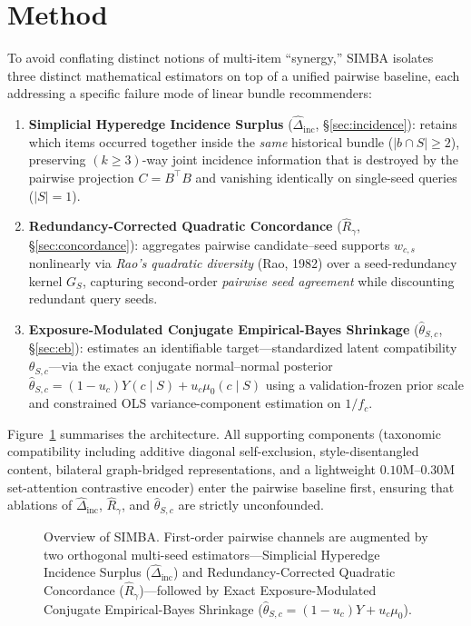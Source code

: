 \section{Method}
\label{sec:method}

To avoid conflating distinct notions of multi-item ``synergy,'' \textsc{SIMBA} isolates three distinct
mathematical estimators on top of a unified pairwise baseline, each addressing a specific failure mode of linear
bundle recommenders:
\begin{enumerate}\itemsep1pt
  \item \textbf{Simplicial Hyperedge Incidence Surplus} ($\hat{\Delta}_{\text{inc}}$, \S\ref{sec:incidence}):
  retains which items occurred together inside the \emph{same} historical bundle ($\lvert b \cap S\rvert \ge 2$),
  preserving $(k \ge 3)$-way joint incidence information that is destroyed by the pairwise projection $C = B^{\!\top} B$
  and vanishing identically on single-seed queries ($\lvert S\rvert = 1$).
  \item \textbf{Redundancy-Corrected Quadratic Concordance} ($\hat{R}_{\gamma}$, \S\ref{sec:concordance}):
  aggregates pairwise candidate--seed supports $w_{c,s}$ nonlinearly via \emph{Rao's quadratic diversity}
  (Rao, 1982) over a seed-redundancy kernel $G_S$, capturing second-order \emph{pairwise seed agreement} while
  discounting redundant query seeds.
  \item \textbf{Exposure-Modulated Conjugate Empirical-Bayes Shrinkage} ($\hat{\theta}_{S,c}$, \S\ref{sec:eb}):
  estimates an identifiable target---standardized latent compatibility $\theta_{S,c}$---via the exact conjugate
  normal--normal posterior $\hat{\theta}_{S,c} = (1 - u_c)Y(c\mid S) + u_c\mu_0(c\mid S)$ using a
  validation-frozen prior scale and constrained OLS variance-component estimation on $1/f_c$.
\end{enumerate}
Figure~\ref{fig:framework} summarises the architecture. All supporting components (taxonomic compatibility
including additive diagonal self-exclusion, style-disentangled content, bilateral graph-bridged representations,
and a lightweight $0.10\text{M}$--$0.30\text{M}$ set-attention contrastive encoder) enter the pairwise baseline
first, ensuring that ablations of $\hat{\Delta}_{\text{inc}}$, $\hat{R}_{\gamma}$, and $\hat{\theta}_{S,c}$ are
strictly unconfounded.

\begin{figure}[t]
  \centering
  \resizebox{\linewidth}{!}{}
  \caption{Overview of \textsc{SIMBA}. First-order pairwise channels are augmented by two orthogonal multi-seed
  estimators---Simplicial Hyperedge Incidence Surplus ($\hat{\Delta}_{\text{inc}}$) and Redundancy-Corrected
  Quadratic Concordance ($\hat{R}_{\gamma}$)---followed by Exact Exposure-Modulated Conjugate Empirical-Bayes
  Shrinkage ($\hat{\theta}_{S,c} = (1-u_c)Y + u_c\mu_0$).}
  \label{fig:framework}
\end{figure}

